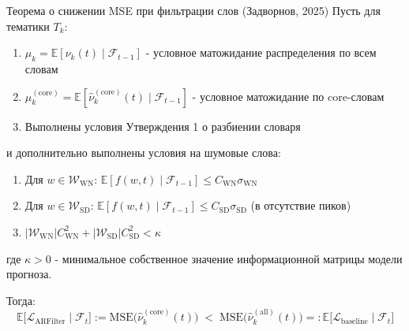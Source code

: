 \documentclass[14pt,a4paper]{article}
\begin{document}

\begin{theorem}{Теорема о снижении MSE при фильтрации слов (Задворнов, 2025)}
Пусть для тематики $T_k$:
\begin{enumerate}
    \item $\mu_k = \mathbb{E}[\nu_k(t) \mid \mathcal{F}_{t-1}]$ - условное матожидание распределения по всем словам
    \item $\mu_k^{(\mathrm{core})} = \mathbb{E}[\widehat{\nu}_k^{(\mathrm{core})}(t) \mid \mathcal{F}_{t-1}]$ - условное матожидание по core-словам
    \item Выполнены условия Утверждения 1 о разбиении словаря
\end{enumerate}
и дополнительно выполнены условия на шумовые слова:
\begin{enumerate}
    \item Для $w \in \mathcal{W}_{\mathrm{WN}}$: $\mathbb{E}[f(w,t) \mid \mathcal{F}_{t-1}] \leq C_{\mathrm{WN}} \sigma_{\mathrm{WN}}$ 
    \item Для $w \in \mathcal{W}_{\mathrm{SD}}$: $\mathbb{E}[f(w,t) \mid \mathcal{F}_{t-1}] \leq C_{\mathrm{SD}} \sigma_{\mathrm{SD}}$ (в отсутствие пиков)
    \item $|\mathcal{W}_{\mathrm{WN}}| C_{\mathrm{WN}}^2 + |\mathcal{W}_{\mathrm{SD}}| C_{\mathrm{SD}}^2 < \kappa$
\end{enumerate}
где $\kappa > 0$ - минимальное собственное значение информационной матрицы модели прогноза.

Тогда:
\[
  \mathbb{E}\!\bigl[\mathcal L_{\mathrm{ARFilter}}\mid \mathcal{F}_{t}\bigr]:=\mathrm{MSE}\bigl(\widehat{\nu}_k^{(\mathrm{core})}(t)\bigr)
  \;<\; 
  \mathrm{MSE}\bigl(\widehat{\nu}_k^{(\mathrm{all})}(t)\bigr) =:\mathbb{E}\!\bigl[\mathcal L_{\mathrm{baseline}}\mid \mathcal{F}_{t}\bigr]
\]
\end{theorem}
\end{document}
